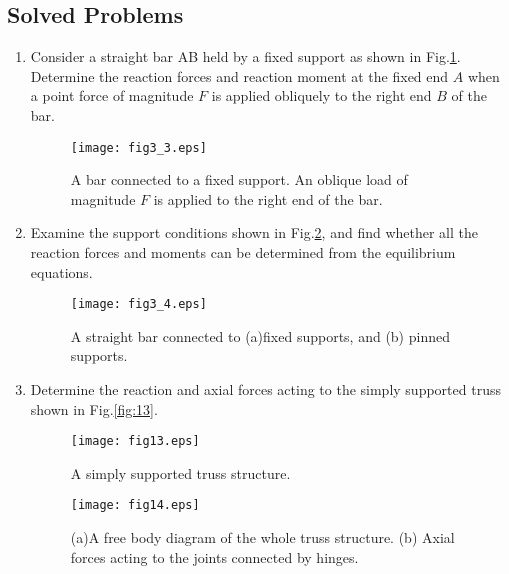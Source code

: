 \documentclass[10pt,a4j]{article}
\begin{document}
\subsection{Solved Problems}
\begin{enumerate}
\item
Consider a straight bar AB held by a fixed support as shown in Fig.\ref{fig:fig3_3}.
Determine the reaction forces and reaction moment at the fixed end $A$ when 
a point force of magnitude $F$ is applied obliquely to the right end $B$ 
of the bar.  
\begin{figure}[h]
	\begin{center}
	\texttt{[image: fig3\_3.eps]} 
	\end{center}
	\caption{A bar connected to a fixed support. 
	An oblique load of magnitude $F$ is applied to the right end of the bar.} 
	\label{fig:fig3_3}
\end{figure}
\item
Examine the support conditions shown in Fig.\ref{fig:fig3_4}, and find whether 
all the reaction forces and moments can be determined from the equilibrium equations. 
\begin{figure}[h]
	\begin{center}
	\texttt{[image: fig3\_4.eps]} 
	\end{center}
	\caption{A straight bar connected to (a)fixed supports, and (b) pinned supports.} 
	\label{fig:fig3_4}
\end{figure}
\item
	Determine the reaction and axial forces acting to the simply supported 
	truss shown in Fig.\ref{fig:13}.
\begin{figure}[h]
	\begin{center}
	\texttt{[image: fig13.eps]} 
	\end{center}
	\caption{A simply supported truss structure.} 
	\label{fig:fig13}
\end{figure}
\begin{figure}[h]
	\begin{center}
	\texttt{[image: fig14.eps]} 
	\end{center}
	\caption{(a)A free body diagram of the whole truss structure.
	(b) Axial forces acting to the joints connected by hinges.} 
	\label{fig:fig14}
\end{figure}
\end{enumerate}
\end{document}
